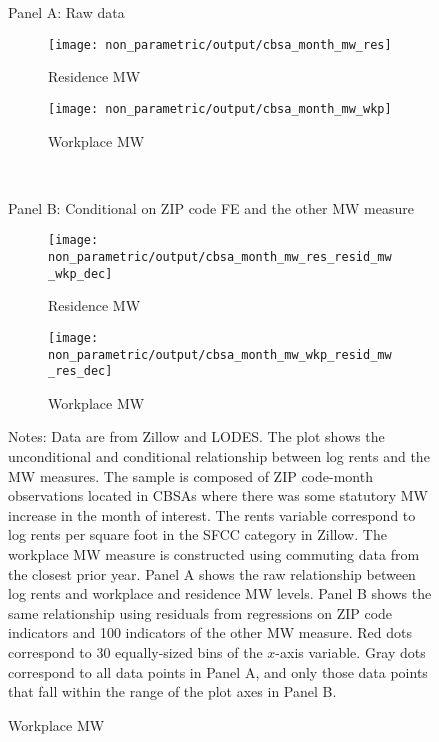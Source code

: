 \begin{figure}[htb!]
    \centering
    \caption{Relationship between log rents and the minimum wage measures, 
             sample of affected ZIP code-months}
    \label{fig:non_parametric}
    
    \begin{minipage}{.95\textwidth} \centering
        Panel A: Raw data
        \vspace{1mm}
    \end{minipage}
    \begin{subfigure}{0.5\textwidth}
        \caption*{Residence MW}
        \texttt{[image: non\_parametric/output/cbsa\_month\_mw\_res]}
    \end{subfigure}%
    \begin{subfigure}{0.5\textwidth}
        \caption*{Workplace MW}
        \texttt{[image: non\_parametric/output/cbsa\_month\_mw\_wkp]}
    \end{subfigure}\\

    \vspace{2mm}
    \begin{minipage}{.95\textwidth} \centering
        Panel B: Conditional on ZIP code FE and the other MW measure
        \vspace{1mm}
    \end{minipage}
    \begin{subfigure}{0.5\textwidth}
        \caption*{Residence MW}
        \texttt{[image: non\_parametric/output/cbsa\_month\_mw\_res\_resid\_mw\_wkp\_dec]}
    \end{subfigure}%
    \begin{subfigure}{0.5\textwidth}
        \caption*{Workplace MW}
        \texttt{[image: non\_parametric/output/cbsa\_month\_mw\_wkp\_resid\_mw\_res\_dec]}
    \end{subfigure}

    \begin{minipage}{.95\textwidth} \footnotesize
        \vspace{3mm}
        Notes:
        Data are from Zillow and LODES.
        The plot shows the unconditional and conditional relationship between 
        log rents and the MW measures.
        The sample is composed of ZIP code-month observations located in CBSAs 
        where there was some statutory MW increase in the month of interest. 
        The rents variable correspond to log rents per square foot in the SFCC 
        category in Zillow.
        The workplace MW measure is constructed using commuting data from the 
        closest prior year.
        Panel A shows the raw relationship between log rents and workplace 
        and residence MW levels.
        Panel B shows the same relationship using residuals from regressions 
        on ZIP code indicators and 100 indicators of the other MW measure.
        Red dots correspond to 30 equally-sized bins of the $x$-axis variable.
        Gray dots correspond to all data points in Panel A, and only those 
        data points that fall within the range of the plot axes in Panel B.
    \end{minipage}
\end{figure}
